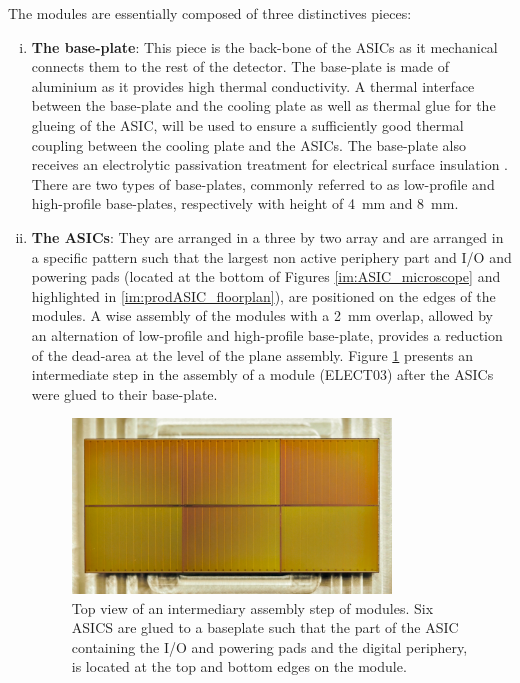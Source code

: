 		The modules are essentially composed of three distinctives pieces: 
		\begin{enumerate}[i)]
			\item \textbf{The base-plate}: This piece is the back-bone of the ASICs as it mechanical connects them to the rest of the detector. The base-plate is made of aluminium as it provides high thermal conductivity. A thermal interface between the base-plate and the cooling plate as well as thermal glue for the glueing of the ASIC, will be used to ensure a sufficiently good thermal coupling between the cooling plate and the ASICs. The base-plate also receives an electrolytic passivation treatment for electrical surface insulation \cite{PreShower_TP}. \\ There are two types of base-plates, commonly referred to as low-profile and high-profile base-plates, respectively with height of \SI{4}{\milli\meter} and \SI{8}{\milli\meter}. 
			\item \textbf{The ASICs}: They are arranged in a three by two array and are arranged in a specific pattern such that the largest non active periphery part and I/O and powering pads (located at the bottom of Figures \ref{im:ASIC_microscope} and highlighted in \ref{im:prodASIC_floorplan}), are positioned on the edges of the modules. A wise assembly of the modules with a \SI{2}{\milli\meter} overlap, allowed by an alternation of low-profile and high-profile base-plate, provides a reduction of the dead-area at the level of the plane assembly. Figure \ref{im:module_ASIC_only} presents an intermediate step in the assembly of a module (ELECT03) after the ASICs were glued to their base-plate.
			\begin{figure}[h]
				\centering
				\includegraphics[width=0.8\textwidth]{files/module_ASIC_only}
				\caption{Top view of an intermediary assembly step of modules. Six ASICS are glued to a baseplate such that the part of the ASIC containing the I/O and powering pads and the digital periphery, is located at the top and bottom edges on the module.}
				\label{im:module_ASIC_only}
			\end{figure}
			

\end{enumerate}
